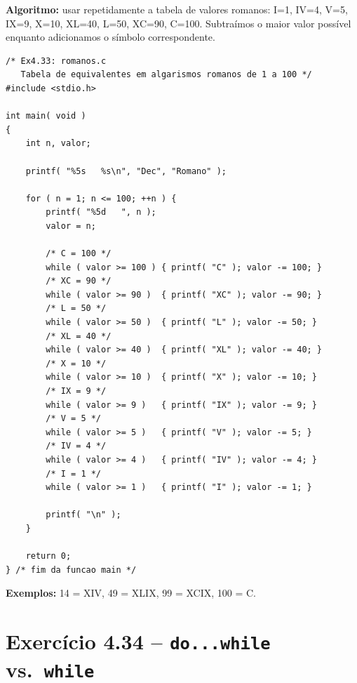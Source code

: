 \documentclass[12pt,a4paper]{article}
\begin{document}
\begin{respostabox}
\textbf{Algoritmo:} usar repetidamente a tabela de valores romanos: I=1, IV=4, V=5,
IX=9, X=10, XL=40, L=50, XC=90, C=100. Subtraímos o maior valor possível enquanto
adicionamos o símbolo correspondente.

\begin{lstlisting}
/* Ex4.33: romanos.c
   Tabela de equivalentes em algarismos romanos de 1 a 100 */
#include <stdio.h>

int main( void )
{
    int n, valor;

    printf( "%5s   %s\n", "Dec", "Romano" );

    for ( n = 1; n <= 100; ++n ) {
        printf( "%5d   ", n );
        valor = n;

        /* C = 100 */
        while ( valor >= 100 ) { printf( "C" ); valor -= 100; }
        /* XC = 90 */
        while ( valor >= 90 )  { printf( "XC" ); valor -= 90; }
        /* L = 50 */
        while ( valor >= 50 )  { printf( "L" ); valor -= 50; }
        /* XL = 40 */
        while ( valor >= 40 )  { printf( "XL" ); valor -= 40; }
        /* X = 10 */
        while ( valor >= 10 )  { printf( "X" ); valor -= 10; }
        /* IX = 9 */
        while ( valor >= 9 )   { printf( "IX" ); valor -= 9; }
        /* V = 5 */
        while ( valor >= 5 )   { printf( "V" ); valor -= 5; }
        /* IV = 4 */
        while ( valor >= 4 )   { printf( "IV" ); valor -= 4; }
        /* I = 1 */
        while ( valor >= 1 )   { printf( "I" ); valor -= 1; }

        printf( "\n" );
    }

    return 0;
} /* fim da funcao main */
\end{lstlisting}

\textbf{Exemplos:} 14 = XIV, 49 = XLIX, 99 = XCIX, 100 = C.
\end{respostabox}

\newpage

\section{Exercício 4.34 -- \texttt{do...while} vs.\ \texttt{while}}
\end{document}
